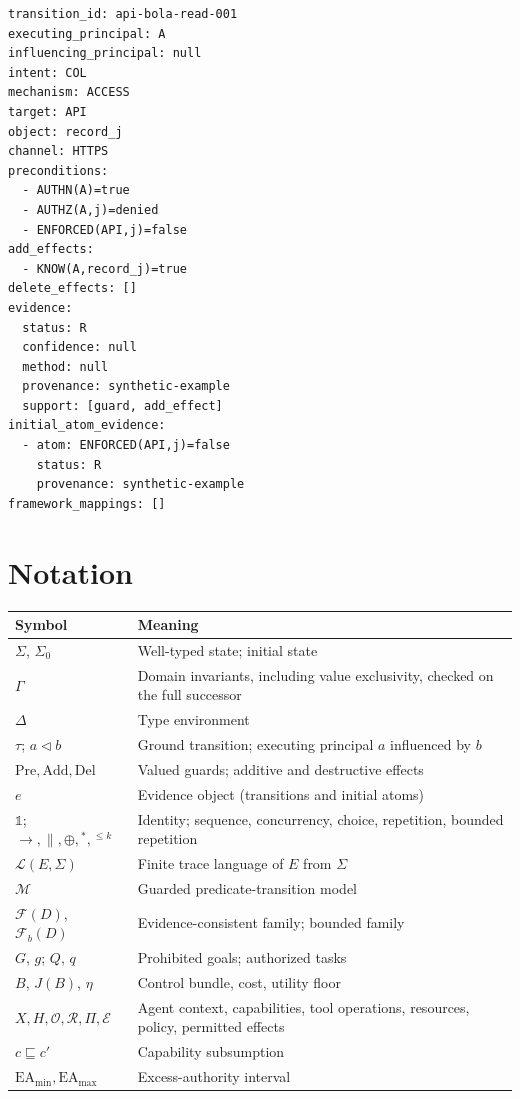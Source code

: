 \documentclass[11pt,letterpaper]{article}
\theoremstyle{definition}
\newcommand{\Pre}{\mathrm{Pre}}
\newcommand{\Add}{\mathrm{Add}}
\newcommand{\Del}{\mathrm{Del}}
\newcommand{\Lang}{\mathcal{L}}
\begin{document}
\begin{footnotesize}
\begin{verbatim}
transition_id: api-bola-read-001
executing_principal: A
influencing_principal: null
intent: COL
mechanism: ACCESS
target: API
object: record_j
channel: HTTPS
preconditions:
  - AUTHN(A)=true
  - AUTHZ(A,j)=denied
  - ENFORCED(API,j)=false
add_effects:
  - KNOW(A,record_j)=true
delete_effects: []
evidence:
  status: R
  confidence: null
  method: null
  provenance: synthetic-example
  support: [guard, add_effect]
initial_atom_evidence:
  - atom: ENFORCED(API,j)=false
    status: R
    provenance: synthetic-example
framework_mappings: []
\end{verbatim}
\end{footnotesize}

\section{Notation}

\begin{center}\footnotesize
\begin{tabular}{@{}ll@{}}
\toprule
Symbol & Meaning \\
\midrule
$\Sigma$, $\Sigma_0$ & Well-typed state; initial state \\
$\Gamma$ & Domain invariants, including value exclusivity, checked on the full successor \\
$\Delta$ & Type environment \\
$\tau$; $a\triangleleft b$ & Ground transition; executing principal $a$ influenced by $b$ \\
$\Pre,\Add,\Del$ & Valued guards; additive and destructive effects \\
$e$ & Evidence object (transitions and initial atoms) \\
$\mathbb{1}$; $\rightarrow,\parallel,\oplus,{}^{*},{}^{\le k}$ & Identity; sequence, concurrency, choice, repetition, bounded repetition \\
$\Lang(E,\Sigma)$ & Finite trace language of $E$ from $\Sigma$ \\
$\mathcal{M}$ & Guarded predicate-transition model \\
$\mathcal{F}(D)$, $\mathcal{F}_b(D)$ & Evidence-consistent family; bounded family \\
$G$, $g$; $Q$, $q$ & Prohibited goals; authorized tasks \\
$B$, $J(B)$, $\eta$ & Control bundle, cost, utility floor \\
$X,H,\mathcal{O},\mathcal{R},\Pi,\mathcal{E}$ & Agent context, capabilities, tool operations, resources, policy, permitted effects \\
$c\sqsubseteq c'$ & Capability subsumption \\
$\mathrm{EA}_{\min},\mathrm{EA}_{\max}$ & Excess-authority interval \\
\bottomrule
\end{tabular}
\end{center}
\end{document}
